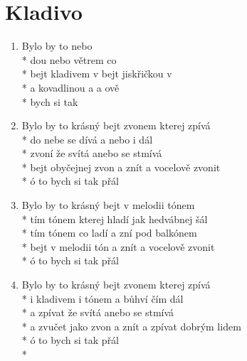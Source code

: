 \section{Kladivo}
\begin{enumerate}
\item Bylo by to    nebo  \\*
 dou nebo   větrem co  \\*
bejt kladivem v  bejt jiskřičkou v  \\*
a kovadlinou  a  a ově  \\*
   bych      si tak         
\item Bylo by to krásný bejt zvonem kterej zpívá \\*
do nebe se dívá a nebo i dál \\*
zvoní že svítá anebo se stmívá \\*
bejt obyčejnej zvon a znít a vocelově zvonit \\*
ó to bych si tak přál 
\item Bylo by to krásný bejt v melodii tónem \\*
tím tónem kterej hladí jak hedvábnej šál \\*
tím tónem co ladí a zní pod balkónem \\*
bejt v melodii tón a znít a vocelově zvonit \\*
ó to bych si tak přál 
\item Bylo by to krásný bejt zvonem kterej zpívá \\*
i kladivem i tónem a bůhví čím dál \\*
a zpívat že svítá anebo se stmívá \\*
a zvučet jako zvon a znít a zpívat dobrým lidem \\*
ó to bych si tak přál \\*
\end{enumerate}
